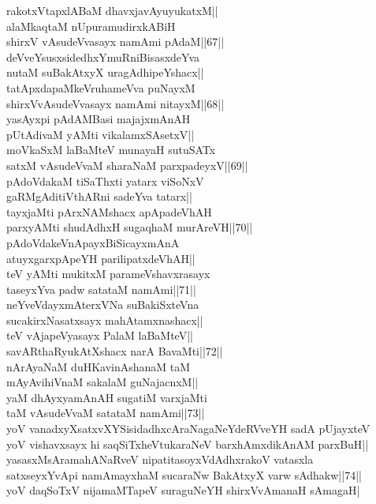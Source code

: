 \documentclass{article}
\begin{document}
rakotxVtapxlABaM dhavxjavAyuyukatxM||\\
alaMkaqtaM nUpuramudirxkABiH\\
shirxV vAsudeVvasayx namAmi pAdaM||67||\\
deVveYsusxsidedhxYmuRniBisasxdeYva\\
nutaM suBakAtxyX uragAdhipeYshacx||\\
tatApxdapaMkeVruhameVva puNayxM\\
shirxVvAsudeVvasayx namAmi nitayxM||68||\\
yasAyxpi pAdAMBasi majajxmAnAH\\
pUtAdivaM yAMti vikalamxSAsetxV||\\
moVkaSxM laBaMteV munayaH sutuSATx\\
satxM vAsudeVvaM sharaNaM parxpadeyxV||69||\\
pAdoVdakaM tiSaThxti yatarx viSoNxV\\
gaRMgAditiVthARni sadeYva tatarx||\\
tayxjaMti pArxNAMshacx apApadeVhAH\\
parxyAMti shudAdhxH sugaqhaM murAreVH||70||\\
pAdoVdakeVnApayxBiSicayxmAnA\\
atuyxgarxpApeYH parilipatxdeVhAH||\\
teV yAMti mukitxM parameVshavxrasayx\\
taseyxYva padw satataM namAmi||71||\\
neYveVdayxmAterxVNa suBakiSxteVna\\
sucakirxNasatxsayx mahAtamxnashacx||\\
teV vAjapeVyasayx PalaM laBaMteV||\\
savARthaRyukAtXshacx narA BavaMti||72||\\
nArAyaNaM duHKavinAshanaM taM\\
mAyAvihiVnaM sakalaM guNajacnxM||\\
yaM dhAyxyamAnAH sugatiM varxjaMti\\
taM vAsudeVvaM satataM namAmi||73||\\
yoV vanadxyXsatxvXYSisidadhxcAraNagaNeYdeRVveYH sadA pUjayxteV\\
yoV vishavxsayx hi saqSiTxheVtukaraNeV barxhAmxdikAnAM parxBuH||\\
yasasxMsAramahANaRveV nipatitasoyxVdAdhxrakoV vatasxla\\
satxseyxYvApi namAmayxhaM sucaraNw BakAtxyX varw sAdhakw||74||\\
yoV daqSoTxV nijamaMTapeV suraguNeYH shirxVvAmanaH sAmagaH|\\
\end{document}
